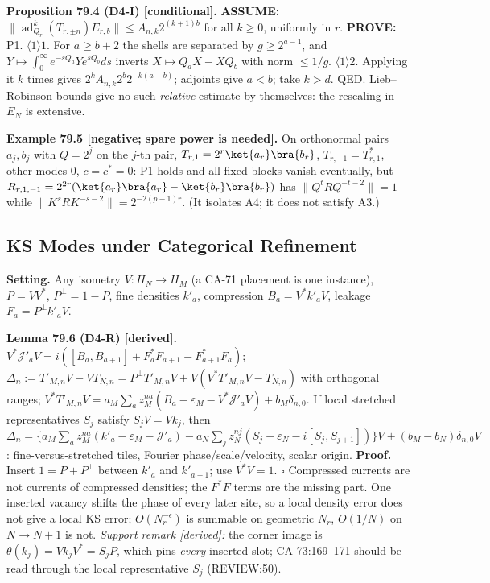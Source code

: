 \textbf{Proposition 79.4 (D4-I) [conditional].}  \textbf{ASSUME:}
\(\|\operatorname{ad}_{Q_r}^k(T_{r,\pm n})E_{r,b}\|\le A_{n,k}2^{(k+1)b}\) for all \(k\ge0\),
uniformly in \(r\).  \textbf{PROVE:} P1.  \(\langle1\rangle1\). For \(a\ge b+2\) the shells are
separated by \(g\ge2^{a-1}\), and \(Y\mapsto\int_0^\infty e^{-sQ_a}Ye^{sQ_b}ds\) inverts
\(X\mapsto Q_aX-XQ_b\) with norm \(\le1/g\).  \(\langle1\rangle2\). Applying it \(k\) times gives
\(2^kA_{n,k}2^b2^{-k(a-b)}\); adjoints give \(a<b\); take \(k>d\).  QED.  Lieb--Robinson
bounds give no such \emph{relative} estimate by themselves: the rescaling in \(E_N\) is extensive.

\textbf{Example 79.5 [negative; spare power is needed].}  On orthonormal pairs \(a_j,b_j\)
with \(Q=2^j\) on the \(j\)-th pair, \(T_{r,1}=2^r\ket{a_r}\bra{b_r}\), \(T_{r,-1}=T_{r,1}^*\),
other modes \(0\), \(c=c^*=0\): P1 holds and all fixed blocks vanish eventually, but
\(R_{r,1,-1}=2^{2r}(\ket{a_r}\bra{a_r}-\ket{b_r}\bra{b_r})\) has \(\|Q^tRQ^{-t-2}\|=1\) while
\(\|K^sRK^{-s-2}\|=2^{-2(p-1)r}\).  (It isolates A4; it does not satisfy A3.)

\subsection{KS Modes under Categorical Refinement}

\textbf{Setting.}  Any isometry \(V:H_N\to H_M\) (a CA-71 placement is one instance),
\(P=VV^*\), \(P^\perp=1-P\), fine densities \(k'_a\), compression \(B_a=V^*k'_aV\), leakage
\(F_a=P^\perp k'_aV\).

\textbf{Lemma 79.6 (D4-R) [derived].}
\(V^*\mathcal J'_aV=i([B_a,B_{a+1}]+F_a^*F_{a+1}-F_{a+1}^*F_a)\);
\(\Delta_n:=T'_{M,n}V-VT_{N,n}=P^\perp T'_{M,n}V+V(V^*T'_{M,n}V-T_{N,n})\) with orthogonal
ranges; \(V^*T'_{M,n}V=a_M\sum_az_M^{na}(B_a-\varepsilon_M-V^*\mathcal J'_aV)+b_M\delta_{n,0}\).
If local stretched representatives \(S_j\) satisfy \(S_jV=Vk_j\), then
\(\Delta_n=\{a_M\sum_az_M^{na}(k'_a-\varepsilon_M-\mathcal J'_a)-a_N\sum_jz_N^{nj}(S_j-\varepsilon_N-i[S_j,S_{j+1}])\}V
+(b_M-b_N)\delta_{n,0}V\): fine-versus-stretched tiles, Fourier phase/scale/velocity, scalar origin.
\textbf{Proof.} Insert \(1=P+P^\perp\) between \(k'_a\) and \(k'_{a+1}\); use \(V^*V=1\). \(\square\)
Compressed currents are not currents of compressed densities; the \(F^*F\) terms are the
missing part.  One inserted vacancy shifts the phase of every later site, so a local density
error does not give a local KS error; \(O(N_r^{-\epsilon})\) is summable on geometric \(N_r\),
\(O(1/N)\) on \(N\to N+1\) is not.  \emph{Support remark [derived]:} the corner image is
\(\theta(k_j)=Vk_jV^*=S_jP\), which pins \emph{every} inserted slot; CA-73:169--171 should be
read through the local representative \(S_j\) (REVIEW:50).

